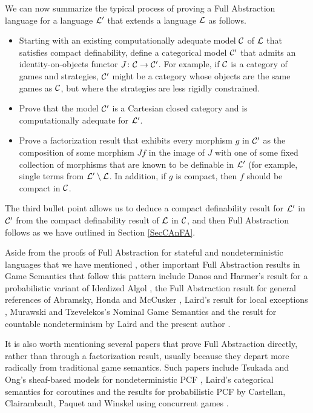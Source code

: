 We can now summarize the typical process of proving a Full Abstraction language for a language $\mathcal L'$ that extends a language $\mathcal L$ as follows.
\begin{itemize}
  \item Starting with an existing computationally adequate model ${\mathcal{C}}$ of $\mathcal L$ that satisfies compact definability, define a categorical model ${\mathcal{C}}'$ that admits an identity-on-objects functor $J\colon {\mathcal{C}} \to {\mathcal{C}}'$.  
    For example, if ${\mathcal{C}}$ is a category of games and strategies, ${\mathcal{C}}'$ might be a category whose objects are the same games as ${\mathcal{C}}$, but where the strategies are less rigidly constrained.
  \item Prove that the model ${\mathcal{C}}'$ is a Cartesian closed category and is computationally adequate for $\mathcal L'$.
  \item Prove a factorization result that exhibits every morphism $g$ in ${\mathcal{C}}'$ as the composition of some morphism $Jf$ in the image of $J$ with one of some fixed collection of morphisms that are known to be definable in $\mathcal L'$ (for example, single terms from $\mathcal L'\setminus\mathcal L$.
    In addition, if $g$ is compact, then $f$ should be compact in ${\mathcal{C}}$.
\end{itemize}
The third bullet point allows us to deduce a compact definability result for $\mathcal L'$ in ${\mathcal{C}}'$ from the compact definability result of $\mathcal L$ in ${\mathcal{C}}$, and then Full Abstraction follows as we have outlined in Section \ref{SecCAnFA}.

Aside from the proofs of Full Abstraction for stateful and nondeterministic languages that we have mentioned \cite{SamsonGuyIAActive,mcCHFiniteND}, other important Full Abstraction results in Game Semantics that follow this pattern include Danos and Harmer's result for a probabilistic variant of Idealized Algol \cite{DanosHarmer}, the Full Abstraction result for general references of Abramsky, Honda and McCusker \cite{HondaMcCusker}, Laird's result for local exceptions \cite{LLi}, Murawski and Tzevelekos's Nominal Game Semantics \cite{NGS} and the result for countable nondeterminism by Laird and the present author \cite{CslPaper}.

It is also worth mentioning several papers that prove Full Abstraction directly, rather than through a factorization result, usually because they depart more radically from traditional game semantics.  
Such papers include Tsukada and Ong's sheaf-based models for nondeterministic PCF \cite{TsukadaSheaves,Sheaves}, Laird's categorical semantics for coroutines \cite{FunctionalProgramsAsCoroutines} and the results for probabilistic PCF by Castellan, Clairambault, Paquet and Winskel using concurrent games \cite{PPCF}.

